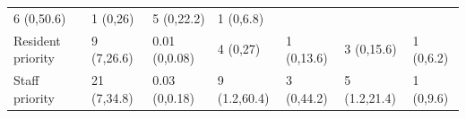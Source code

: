 \documentclass[
]{article}
\begin{document}
\begin{longtable}[]{@{}lllllll@{}}
\begin{minipage}[t]{0.11\columnwidth}
6 (0,50.6)\strut
\end{minipage} & \begin{minipage}[t]{0.11\columnwidth}\raggedright
1 (0,26)\strut
\end{minipage} & \begin{minipage}[t]{0.09\columnwidth}\raggedright
5 (0,22.2)\strut
\end{minipage} & \begin{minipage}[t]{0.10\columnwidth}\raggedright
1 (0,6.8)\strut
\end{minipage}\tabularnewline
\begin{minipage}[t]{0.18\columnwidth}\raggedright
Resident priority\strut
\end{minipage} & \begin{minipage}[t]{0.12\columnwidth}\raggedright
9 (7,26.6)\strut
\end{minipage} & \begin{minipage}[t]{0.10\columnwidth}\raggedright
0.01 (0,0.08)\strut
\end{minipage} & \begin{minipage}[t]{0.11\columnwidth}\raggedright
4 (0,27)\strut
\end{minipage} & \begin{minipage}[t]{0.11\columnwidth}\raggedright
1 (0,13.6)\strut
\end{minipage} & \begin{minipage}[t]{0.09\columnwidth}\raggedright
3 (0,15.6)\strut
\end{minipage} & \begin{minipage}[t]{0.10\columnwidth}\raggedright
1 (0,6.2)\strut
\end{minipage}\tabularnewline
\begin{minipage}[t]{0.18\columnwidth}\raggedright
Staff priority\strut
\end{minipage} & \begin{minipage}[t]{0.12\columnwidth}\raggedright
21 (7,34.8)\strut
\end{minipage} & \begin{minipage}[t]{0.10\columnwidth}\raggedright
0.03 (0,0.18)\strut
\end{minipage} & \begin{minipage}[t]{0.11\columnwidth}\raggedright
9 (1.2,60.4)\strut
\end{minipage} & \begin{minipage}[t]{0.11\columnwidth}\raggedright
3 (0,44.2)\strut
\end{minipage} & \begin{minipage}[t]{0.09\columnwidth}\raggedright
5 (1.2,21.4)\strut
\end{minipage} & \begin{minipage}[t]{0.10\columnwidth}\raggedright
1 (0,9.6)\strut
\end{minipage}\tabularnewline
\bottomrule
\end{longtable}
\end{document}

